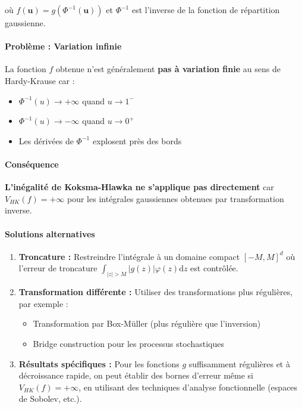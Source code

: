 \documentclass[12pt,a4paper]{article}
\theoremstyle{definition}
\theoremstyle{remark}
\newcommand{\dd}{\mathrm{d}}
\begin{document}
où $f(\mathbf{u}) = g(\Phi^{-1}(\mathbf{u}))$ et $\Phi^{-1}$ est l'inverse de la fonction de répartition gaussienne.

\paragraph{Problème : Variation infinie}

La fonction $f$ obtenue n'est généralement \textbf{pas à variation finie} au sens de Hardy-Krause car :
\begin{itemize}
\item $\Phi^{-1}(u) \to +\infty$ quand $u \to 1^-$
\item $\Phi^{-1}(u) \to -\infty$ quand $u \to 0^+$
\item Les dérivées de $\Phi^{-1}$ explosent près des bords
\end{itemize}

\paragraph{Conséquence}

\textbf{L'inégalité de Koksma-Hlawka ne s'applique pas directement} car $V_{HK}(f) = +\infty$ pour les intégrales gaussiennes obtenues par transformation inverse.

\paragraph{Solutions alternatives}

\begin{enumerate}
\item \textbf{Troncature :} Restreindre l'intégrale à un domaine compact $[-M, M]^d$ où l'erreur de troncature $\int_{|z|>M} |g(z)|\varphi(z)\dd z$ est contrôlée.

\item \textbf{Transformation différente :} Utiliser des transformations plus régulières, par exemple :
\begin{itemize}
\item Transformation par Box-Müller (plus régulière que l'inversion)
\item Bridge construction pour les processus stochastiques
\end{itemize}

\item \textbf{Résultats spécifiques :} Pour les fonctions $g$ suffisamment régulières et à décroissance rapide, on peut établir des bornes d'erreur même si $V_{HK}(f) = +\infty$, en utilisant des techniques d'analyse fonctionnelle (espaces de Sobolev, etc.).
\end{enumerate}
\end{document}
